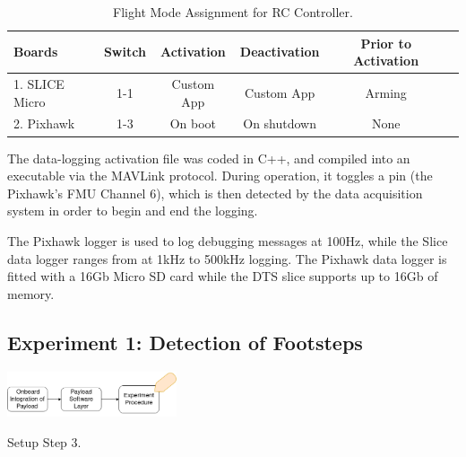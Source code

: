 \begin{table}[!h]
  \footnotesize%
  \begin{flushleft}
    \begin{tabular}{lccccl}
      \toprule
      Boards                     & Switch  & Activation & Deactivation & Prior to Activation \\
      \midrule
      1. SLICE Micro    & 1-1    &  Custom App  & Custom App    & Arming  \\
      2. Pixhawk        & 1-3    &  On boot         & On shutdown       & None \\
      \bottomrule
    \end{tabular}
  \end{flushleft}
  \caption{Flight Mode Assignment for RC Controller.}
  \label{tab:rc_assignment}
\end{table}

The data-logging activation file was coded in C++, and compiled into an executable via the MAVLink protocol. During operation, it toggles a pin (the Pixhawk's FMU Channel 6), which is then detected by the data acquisition system in order to begin and end the logging. 

The Pixhawk logger is used to log debugging messages at 100Hz, while the Slice data logger ranges from  at 1kHz to 500kHz logging. The Pixhawk data logger is fitted with a 16Gb Micro SD card while the DTS slice supports up to 16Gb of memory.


\subsection{Experiment 1: Detection of Footsteps}

\begin{marginfigure}%
    \raggedright
    {\includegraphics[width=5cm]{images/stage_system/drone_setup/payload_onboard3.png}}
    \caption{Setup Step 3.}
    \label{fig:vibration_prep3}
\end{marginfigure}


